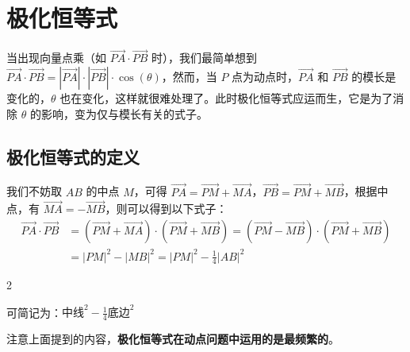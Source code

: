 \section{极化恒等式}
当出现向量点乘（如 $\overrightarrow{PA} \cdot \overrightarrow{PB}$ 时），我们最简单想到 $\overrightarrow{PA} \cdot \overrightarrow{PB} = |\overrightarrow{PA}| \cdot |\overrightarrow{PB}| \cdot \cos(\theta)$，然而，当 $P$ 点为动点时，$\overrightarrow{PA}$ 和 $\overrightarrow{PB}$ 的模长是变化的，$\theta$ 也在变化，这样就很难处理了。此时极化恒等式应运而生，它是为了消除 $\theta$ 的影响，变为仅与模长有关的式子。

\subsection{极化恒等式的定义}
\begin{definition}
    我们不妨取 $AB$ 的中点 $M$，可得 $\overrightarrow{PA} = \overrightarrow{PM} + \overrightarrow{MA}$，$ \overrightarrow{PB} = \overrightarrow{PM} + \overrightarrow{MB}$，根据中点，有 $\overrightarrow{MA} = -\overrightarrow{MB}$，则可以得到以下式子：
    \begin{align}
        \overrightarrow{PA} \cdot \overrightarrow{PB} & =(\overrightarrow{PM} + \overrightarrow{MA}) \cdot (\overrightarrow{PM} + \overrightarrow{MB}) = (\overrightarrow{PM} - \overrightarrow{MB}) \cdot (\overrightarrow{PM} + \overrightarrow{MB}) \\
                                                      & = |PM|^2 - |MB|^2 = |PM|^2 - \frac{1}{4}|AB|^2
    \end{align}
\end{definition}

\begin{multicols}{2}

    \columnbreak

    可简记为：$\text{中线}^2 - \frac{1}{4}\text{底边}^2$

    注意上面提到的内容，\textbf{极化恒等式在动点问题中运用的是最频繁的}。

\end{multicols}


